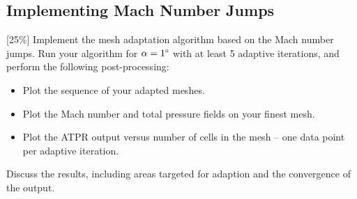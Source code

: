 \pagebreak
\subsection{Implementing Mach Number Jumps}
[25\%] Implement the mesh adaptation algorithm based on the Mach number jumps. Run your algorithm for $\alpha = 1\degree$ with at least 5 adaptive iterations, and perform the following post-processing:

\begin{itemize}
    \item Plot the sequence of your adapted meshes.
    \item Plot the Mach number and total pressure fields on your finest mesh.
    \item Plot the ATPR output versus number of cells in the mesh -- one data point per adaptive iteration.
\end{itemize}

Discuss the results, including areas targeted for adaption and the convergence of the output.